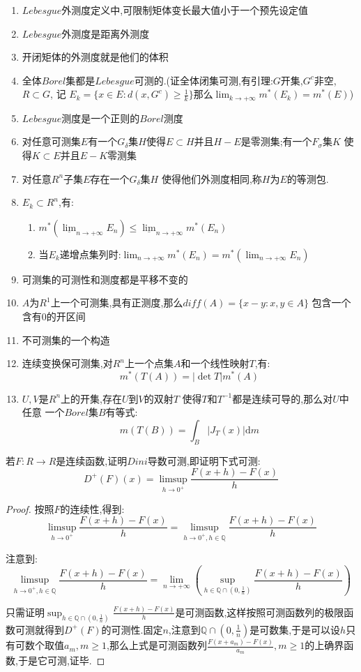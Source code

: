 \begin{enumerate}
  \item $Lebesgue$外测度定义中,可限制矩体变长最大值小于一个预先设定值
  \item $Lebesgue$外测度是距离外测度
  \item 开闭矩体的外测度就是他们的体积
  \item 全体$Borel$集都是$Lebesgue$可测的.(证全体闭集可测,有引理:$G$开集,$G^c$非空,$R\subset G$, 记
  $E_k=\{x\in E:d(x,G^c)\ge\frac{1}{k}\}$那么$\lim_ {k\to+\infty}m^*(E_k)=m^*(E)$)
  \item $Lebesgue$测度是一个正则的$Borel$测度
  \item 对任意可测集$E$有一个$G_{\delta}$集$H$使得$E\subset H$并且$H-E$是零测集;有一个$F_{\sigma}$集$K$ 使得$K\subset E$并且$E-K$零测集
  \item 对任意$R^n$子集$E$存在一个$G_{\delta}$集$H$ 使得他们外测度相同,称$H$为$E$的等测包.
  \item $E_k\subset R^n$,有:
   \begin{enumerate}
   \item $m^*(\underline{\lim}_{n\to+\infty}E_n)\le\underline{\lim}_{n\to+\infty}m^*(E_n)$
   \item 当$E_k$递增点集列时:$\lim_ {n\to+\infty}m^*(E_n)=m^*(\lim_{n\to+\infty}E_n)$
   \end{enumerate}
  \item 可测集的可测性和测度都是平移不变的
  \item $A$为$R^1$上一个可测集,具有正测度,那么$diff(A)=\{x-y:x,y\in A\}$ 包含一个含有0的开区间
  \item 不可测集的一个构造
  \item 连续变换保可测集,对$R^n$上一个点集$A$和一个线性映射$T$,有:
  $$m^*(T(A))=|\det T|m^*(A)$$
  \item $U,V$是$R^n$上的开集,存在$U$到$V$的双射$T$ 使得$T$和$T^ {-1}$都是连续可导的,那么对$U$中任意
  一个$Borel$集$B$有等式:
  $$m(T(B))=\int_B|J_T(x)|\mathrm{d}m$$
\end{enumerate}

若$F:R\to R$是连续函数,证明$Dini$导数可测,即证明下式可测:
$$D^+(F)(x)=\limsup_{h\to 0^+}\frac{F(x+h)-F(x)}{h}$$
\begin{proof}

按照$F$的连续性,得到:
$$\limsup_{h\to 0^+}\frac{F(x+h)-F(x)}{h}=\limsup_{h\to 0^+,h\in\mathbb{Q}}\frac{F(x+h)-F(x)}{h}$$

注意到:
$$\limsup_{h\to 0^+,h\in\mathbb{Q}}\frac{F(x+h)-F(x)}{h}
=\lim_{n\to +\infty}\left(\sup_{h\in\mathbb{Q}\cap (0,\frac{1}{n})}\frac{F(x+h)-F(x)}{h}\right)$$

只需证明$\sup_{h\in\mathbb{Q}\cap (0,\frac{1}{n})}\frac{F(x+h)-F(x)}{h}$是可测函数,这样按照可测函数列的极限函数可测就得到$D^+(F)$的可测性.固定$n$,注意到$\mathbb{Q}\cap(0,\frac{1}{n})$是可数集,于是可以设$h$只有可数个取值$a_m,m\ge1$,那么上式是可测函数列$\frac{F(x+a_m)-F(x)}{a_m},m\ge1$的上确界函数,于是它可测,证毕.

\end{proof}
